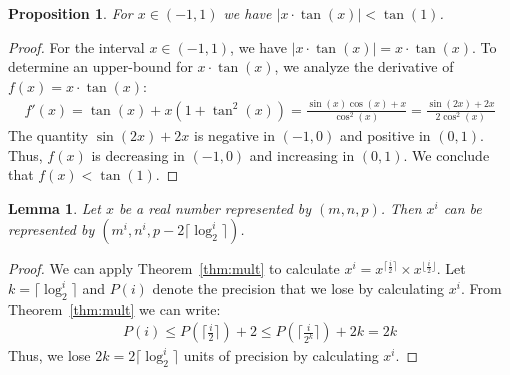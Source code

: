 \documentclass{article}
\numberwithin{mytheorem}{section}
\newtheorem{proposition}{Proposition}
\newtheorem{lemma}{Lemma}
\begin{document}
\begin{proposition}\label{prop:cos_condition}
For $x\in(-1,1)$ we have $|x\cdot\tan(x)|<\tan(1)$.
\end{proposition}

\begin{proof}
For the interval $x\in(-1,1)$, we have $|x\cdot\tan(x)|=x\cdot\tan(x)$. To determine an upper-bound for $x\cdot\tan(x)$, we analyze the derivative of $f(x)=x\cdot\tan(x)$:
\begin{align*}
f'(x)=\tan(x)+x(1+\tan^2(x))=\frac{\sin(x)\cos(x)+x}{\cos^2(x)}=\frac{\sin(2x)+2x}{2\cos^2(x)}
\end{align*}
The quantity $\sin(2x)+2x$ is negative in $(-1,0)$ and positive in $(0,1)$. Thus, $f(x)$ is decreasing in $(-1,0)$ and increasing in $(0,1)$. We conclude that $f(x)<\tan(1)$.

\end{proof}


\begin{lemma}\label{lm:power}
Let $x$ be a real number represented by $(m,n,p)$. Then $x^i$ can be represented by $(m^i,n^i,p-2\lceil \log_2^i \rceil)$. 
\end{lemma}

\begin{proof}
We can apply Theorem~\ref{thm:mult} to calculate $x^i=x^{\lceil \frac{i}{2} \rceil}\times x^{\lfloor \frac{i}{2} \rfloor}$. Let $k=\lceil \log_2^i \rceil$ and $P(i)$ denote the precision that we lose by calculating $x^i$. From Theorem~\ref{thm:mult} we can write:
\begin{align*}
P(i)\leq P(\lceil \frac{i}{2} \rceil)+2\leq P(\lceil \frac{i}{2^k} \rceil)+2k=2k
\end{align*}
Thus, we lose $2k=2\lceil \log_2^i \rceil$ units of  precision by calculating $x^i$.

\end{proof}
\end{document}
